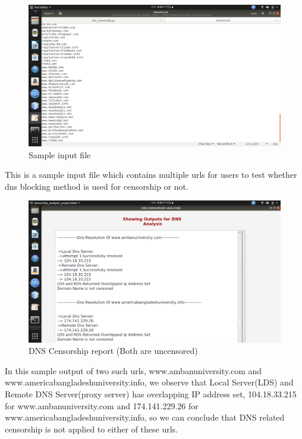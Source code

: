 \documentclass[12pt]{article}
\begin{document}
\newpage

\begin{figure}[H]
    \includegraphics[width=\textwidth]{file.png}
    \caption{Sample input file}
    \label{fig:file}
\end{figure}

This is a sample input file which contains multiple urls for users to test whether dns blocking method is used for censorship or not.





\newpage
\begin{figure}[H]
    \centering
    \includegraphics[width=\textwidth]{bu.png}
    \caption{DNS Censorship report (Both are uncensored)}
    \label{fig:dcr2}
\end{figure}
In this sample output of two such urls, www.ambanuniversity.com and\\ www.americabangladeshuniversity.info, we observe that Local Server(LDS) and Remote DNS Server(proxy server) has overlapping IP address set, 104.18.33.215 for www.ambanuniversity.com and 174.141.229.26 for www.americabangladeshuniversity.info, so we can conclude that DNS related censorship is not applied to either of these urls.
\end{document}
